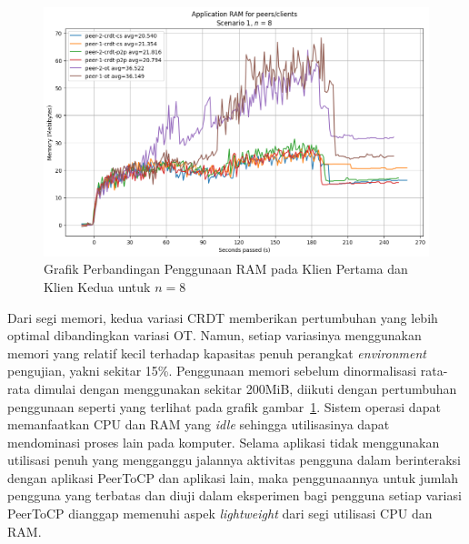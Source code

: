 \begin{figure}
 \centering
 \includegraphics[width=13cm]{./assets/skripsi/benchmark-vis_cell_2_output_21}
 \caption{Grafik Perbandingan Penggunaan RAM pada Klien Pertama dan Klien Kedua untuk $n = 8$}
 \label{fig:2-21}
\end{figure}

Dari segi memori, kedua variasi CRDT memberikan pertumbuhan yang lebih optimal dibandingkan variasi OT. Namun, setiap variasinya menggunakan memori yang relatif kecil terhadap kapasitas penuh perangkat \textit{environment} pengujian, yakni sekitar 15\%. Penggunaan memori sebelum dinormalisasi rata-rata dimulai dengan menggunakan sekitar 200MiB, diikuti dengan pertumbuhan penggunaan seperti yang terlihat pada grafik gambar~\ref{fig:2-21}. Sistem operasi dapat memanfaatkan CPU dan RAM yang \textit{idle} sehingga utilisasinya dapat mendominasi proses lain pada komputer. Selama aplikasi tidak menggunakan utilisasi penuh yang mengganggu jalannya aktivitas pengguna dalam berinteraksi dengan aplikasi PeerToCP dan aplikasi lain, maka penggunaannya untuk jumlah pengguna yang terbatas dan diuji dalam eksperimen bagi pengguna setiap variasi PeerToCP dianggap memenuhi aspek \textit{lightweight} dari segi utilisasi CPU dan RAM.


